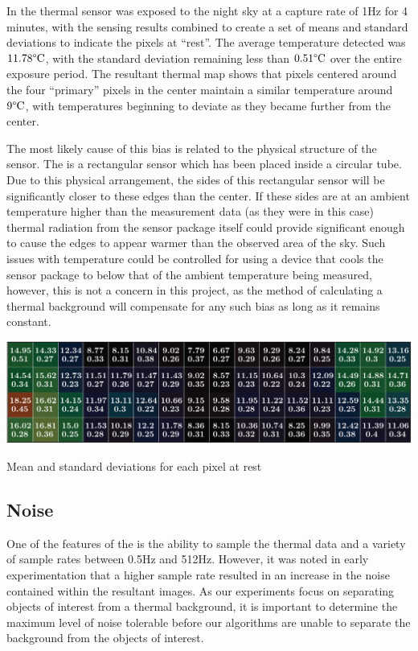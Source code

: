 \documentclass[../thesis/thesis.tex]{subfiles}
\begin{document}
In  the thermal sensor was exposed to the night sky at a capture rate of 1Hz for 4 minutes, with the sensing results combined to create a set of means and standard deviations to indicate the pixels at ``rest''. The average temperature detected was $11.78\degree\textrm{C}$, with the standard deviation remaining less than $0.51\degree\textrm{C}$ over the entire exposure period. The resultant thermal map shows that pixels centered around the four ``primary'' pixels in the center maintain a similar temperature around $9\degree\textrm{C}$, with temperatures beginning to deviate as they became further from the center.

The most likely cause of this bias is related to the physical structure of the sensor. The \mlx is a rectangular sensor which has been placed inside a circular tube. Due to this physical arrangement, the sides of this rectangular sensor will be significantly closer to these edges than the center. If these sides are at an ambient temperature higher than the measurement data (as they were in this case) thermal radiation from the sensor package itself could provide significant enough to cause the edges to appear warmer than the observed area of the sky. Such issues with temperature could be controlled for using a device that cools the sensor package to below that of the ambient temperature being measured, however, this is not a concern in this project, as the method of calculating a thermal background will compensate for any such bias as long as it remains constant.

\begin{landscape}
\begin{table}
\centering
\includegraphics{../diagrams/sensor-bias-thermal-map.pdf}
\caption{Mean and standard deviations for each pixel at rest}
\label{tab:meanstd}
\end{table}
\end{landscape}


\subsection{Noise}

One of the features of the \mlx is the ability to sample the thermal data and a variety of sample rates between 0.5Hz and 512Hz. However, it was noted in early experimentation that a higher sample rate resulted in an increase in the noise contained within the resultant images. As our experiments focus on separating objects of interest from a thermal background, it is important to determine the maximum level of noise tolerable before our algorithms are unable to separate the background from the objects of interest.
\end{document}

